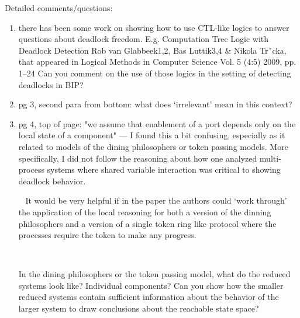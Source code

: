 Detailed comments/questions:
\begin{enumerate}

\item there has been some work on showing how to use CTL-like logics to answer
questions about deadlock freedom.  E.g.
  Computation Tree Logic with Deadlock Detection
  Rob van Glabbeek1,2, Bas Luttik3,4 \& Nikola Trˇcka, that appeared in
  Logical Methods in Computer Science
  Vol. 5 (4:5) 2009, pp. 1–24
Can you comment on the use of those logics in the setting of detecting deadlocks in
BIP?


\item  pg 3, second para from bottom: what does `irrelevant' mean in this context?


\item pg 4, top of page: "we assume that enablement of a port depends only on the
local state of a component" --- I found this a bit confusing, especially as it related
to models of the dining philosophers or token passing models.  More specifically, I
did not follow the reasoning about how one analyzed multi-process systems
where shared variable interaction was critical to showing deadlock behavior.


~
It would be very helpful if in the paper the authors could `work through' the application
of the local reasoning for both a version of the dinning philosophers and a version
of a single token ring like protocol where the processes require the token to make
any progress.

~

 In the dining philosophers or the token passing model, what do the reduced systems
look like? Individual components?  Can you show how the smaller reduced systems
contain sufficient information about the behavior of the larger system to draw conclusions
about the reachable state space?


\end{enumerate}
